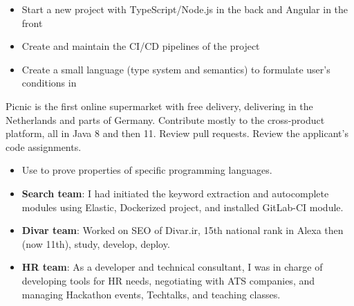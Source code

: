 \documentclass[10pt,a4paper]{altacv}
\begin{document}
     

\divider


\begin{itemize}
    \item Start a new project with TypeScript/Node.js in the back and Angular in the front
    \item Create and maintain the CI/CD pipelines of the project
    \item Create a small language (type system and semantics) to formulate user's conditions in
\end{itemize}

\divider


Picnic is the first online supermarket with free delivery, delivering in the Netherlands and parts of Germany. Contribute mostly to the cross-product platform, all in Java 8 and then 11. Review pull requests. Review the applicant's code assignments.

\divider


\begin{itemize}
\item Use  to prove properties of specific programming languages.
\end{itemize}

\divider

\begin{itemize}
\item \textbf{Search team}: I had initiated the keyword extraction and autocomplete modules using Elastic, Dockerized project, and installed GitLab-CI module.
\item \textbf{Divar team}: Worked on SEO of Divar.ir, 15th national rank in Alexa then (now 11th), study, develop, deploy.
\item \textbf{HR team}: As a developer and technical consultant, I was in charge of developing tools for HR needs, negotiating with ATS companies, and managing Hackathon events, Techtalks, and teaching classes.
\end{itemize}
\end{document}
